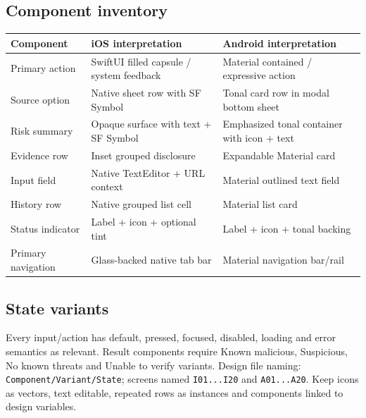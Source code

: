 \documentclass[10pt,a4paper]{article}
\begin{document}
\subsection{Component inventory}
\begin{tabularx}{\linewidth}{@{}p{37mm}Y Y@{}}\toprule
\textbf{Component} & \textbf{iOS interpretation} & \textbf{Android interpretation} \\ \midrule
Primary action & SwiftUI filled capsule / system feedback & Material contained / expressive action \\
Source option & Native sheet row with SF Symbol & Tonal card row in modal bottom sheet \\
Risk summary & Opaque surface with text + SF Symbol & Emphasized tonal container with icon + text \\
Evidence row & Inset grouped disclosure & Expandable Material card \\
Input field & Native TextEditor + URL context & Material outlined text field \\
History row & Native grouped list cell & Material list card \\
Status indicator & Label + icon + optional tint & Label + icon + tonal backing \\
Primary navigation & Glass-backed native tab bar & Material navigation bar/rail \\
\bottomrule\end{tabularx}

\subsection{State variants}
Every input/action has default, pressed, focused, disabled, loading and error semantics as relevant. Result components require Known malicious, Suspicious, No known threats and Unable to verify variants. Design file naming: \texttt{Component/Variant/State}; screens named \texttt{I01...I20} and \texttt{A01...A20}. Keep icons as vectors, text editable, repeated rows as instances and components linked to design variables.
\end{document}
